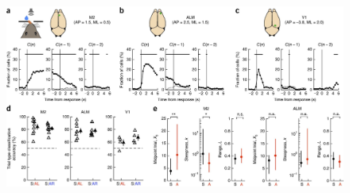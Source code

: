 \begin{figure}[htbp]

\begin{center}
\includegraphics[width=\textwidth]{Figures/Chapter3/NN_fig7} 
\end{center}


\end{figure}
